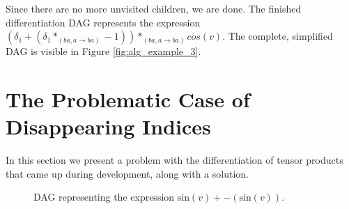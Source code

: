 \documentclass[12pt, a4paper]{report}
\begin{document}
Since there are no more unvisited children, we are done.
The finished differentiation DAG represents the expression $(\delta_1 + (\delta_1 *_{(ba,a \rightarrow ba)} -1)) *_{(ba,a \rightarrow ba)} cos(v)$.
The complete, simplified DAG is visible in Figure \ref{fig:alg_example_3}.

\section{The Problematic Case of Disappearing Indices}
In this section we present a problem with the differentiation of tensor products that came up during development, along with a solution.

\begin{figure}
    \centering
    \caption{DAG representing the expression $\text{sin}(v) + -(\text{sin}(v))$.}
    \label{fig:alg_example_1}
\end{figure}
\end{document}
